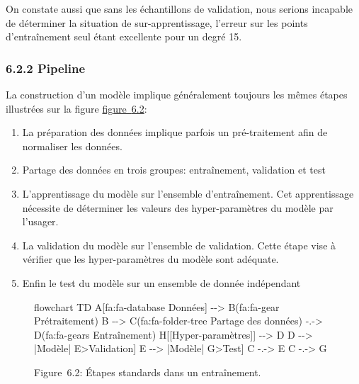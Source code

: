 \documentclass[
]{article}
\newenvironment{Shaded}{}{}
\newcommand{\NormalTok}[1]{#1}
\begin{document}
On constate aussi que sans les échantillons de validation, nous serions
incapable de déterminer la situation de sur-apprentissage, l'erreur sur
les points d'entraînement seul étant excellente pour un degré 15.

\subsubsection{\texorpdfstring{{6.2.2}
Pipeline}{6.2.2 Pipeline}}\label{pipeline}

La construction d'un modèle implique généralement toujours les mêmes
étapes illustrées sur la figure \hyperref[fig-pipeline]{figure~{6.2}}:

\begin{enumerate}
\def\labelenumi{\arabic{enumi}.}
\item
  La préparation des données implique parfois un pré-traitement afin de
  normaliser les données.
\item
  Partage des données en trois groupes: entraînement, validation et test
\item
  L'apprentissage du modèle sur l'ensemble d'entraînement. Cet
  apprentissage nécessite de déterminer les valeurs des hyper-paramètres
  du modèle par l'usager.
\item
  La validation du modèle sur l'ensemble de validation. Cette étape vise
  à vérifier que les hyper-paramètres du modèle sont adéquate.
\item
  Enfin le test du modèle sur un ensemble de donnée indépendant
\end{enumerate}

\label{fig-pipeline}
\begin{figure}
\centering
\begin{Shaded}
\begin{Highlighting}[]
\NormalTok{flowchart TD}
\NormalTok{    A[fa:fa{-}database Données] {-}{-}\textgreater{} B(fa:fa{-}gear Prétraitement)}
\NormalTok{    B {-}{-}\textgreater{} C(fa:fa{-}folder{-}tree Partage des données) {-}.{-}\textgreater{} D(fa:fa{-}gears Entraînement)}
\NormalTok{    H[[Hyper{-}paramètres]] {-}{-}\textgreater{} D}
\NormalTok{    D {-}{-}\textgreater{} |Modèle| E\textgreater{}Validation]}
\NormalTok{    E {-}{-}\textgreater{} |Modèle| G\textgreater{}Test]}
\NormalTok{    C {-}.{-}\textgreater{} E}
\NormalTok{    C {-}.{-}\textgreater{} G}
\end{Highlighting}
\end{Shaded}
\caption{Figure~6.2: Étapes standards dans un entraînement.}
\end{figure}
\end{document}
